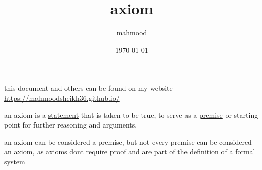\documentclass[a4paper,12pt]{article}
\author{mahmood}
\date{\today}
\title{axiom}
\begin{document}
\maketitle
\begin{note}
this document and others can be found on my website\\
\url{https://mahmoodsheikh36.github.io/}
\end{note}
\begin{definition}
an axiom is a \href{20230401175139-statement.org}{statement} that is taken to be true, to serve as a \href{20230524212241-premise.org}{premise} or starting point for further reasoning and arguments.\\[0pt]
\end{definition}
\begin{note}
an axiom can be considered a premise, but not every premise can be considered an axiom, as axioms dont require proof and are part of the definition of a \href{20230524203100-formal_system.org}{formal system}\\[0pt]
\end{note}
\end{document}
